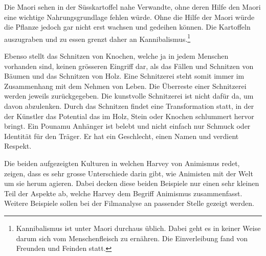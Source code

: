 Die Maori sehen in der Süsskartoffel nahe Verwandte, ohne deren Hilfe den Maori eine wichtige Nahrungsgrundlage fehlen würde. Ohne die Hilfe der Maori würde die Pflanze jedoch gar nicht erst wachsen und gedeihen können. Die Kartoffeln auszugraben und zu essen grenzt daher an Kannibalismus.\footnote{Kannibalismus ist unter Maori durchaus üblich. Dabei geht es in keiner Weise darum sich vom Menschenfleisch zu ernähren. Die Einverleibung fand von Freunden und Feinden statt.}

Ebenso stellt das Schnitzen von Knochen, welche ja in jedem Menschen vorhanden sind, keinen grösseren Eingriff dar, als das Fällen und Schnitzen von Bäumen und das Schnitzen von Holz. Eine Schnitzerei steht somit immer im Zusammenhang mit dem Nehmen von Leben. Die Überreste einer Schnitzerei werden jeweils zurückgegeben. Die kunstvolle Schnitzerei ist nicht dafür da, um davon abzulenken. Durch das Schnitzen findet eine Transformation statt, in der der Künstler das Potential das im Holz, Stein oder Knochen schlummert hervor bringt. Ein Pounamu Anhänger ist belebt und nicht einfach nur Schmuck oder Identität für den Träger. Er hat ein Geschlecht, einen Namen und verdient Respekt. 

\medskip
Die beiden aufgezeigten Kulturen in welchen Harvey von Animismus redet, zeigen, dass es sehr grosse Unterschiede darin gibt, wie Animisten mit der Welt um sie herum agieren. Dabei decken diese beiden Beispiele nur einen sehr kleinen Teil der Aspekte ab, welche Harvey dem Begriff Animismus zusammenfasst. Weitere Beispiele sollen bei der Filmanalyse an passender Stelle gezeigt werden. 




